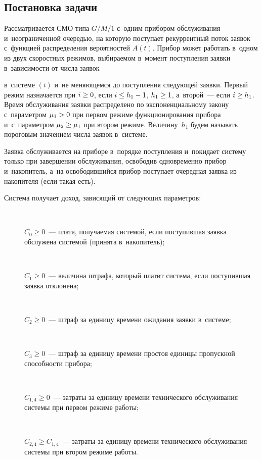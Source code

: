 \begin{multicols}{2}
\vspace*{-12pt}

\section{Постановка задачи}

\vspace*{-3pt}

  Рассматривается СМО типа $G/M/1$ с~одним прибором обслуживания 
  и~неограниченной оче\-редью, на которую поступает рекуррентный поток заявок 
  с~функцией распределения вероятностей $A(t)$. Прибор может работать в~одном 
из двух скоростных режимов, выбираемом в~момент поступления заявки 
в~зависимости от числа заявок\linebreak\vspace*{-12pt}

\pagebreak

\noindent
 в~сис\-те\-ме $(i)$ и~не меняющемся до 
поступления следующей заявки. Первый режим назначается при $i\hm\geq0$, 
если $i\hm\leq h_1\hm- 1$, $h_1\hm\geq 1$, а~второй~--- если $i\hm\geq h_1$. 
Время обслуживания заявки распределено по экспоненциальному закону 
с~па\-ра\-мет\-ром $\mu_1\hm>0$ при первом режиме функционирования прибора 
и~с~па\-ра\-мет\-ром $\mu_2\hm\geq \mu_1$ при втором режиме. Величину~$h_1$ 
будем называть пороговым значением числа заявок в~сис\-теме.
  
  Заявка обслуживается на приборе в~порядке поступления и~покидает сис\-те\-му 
только при завершении обслуживания, освободив одновременно прибор 
и~накопитель, а~на освободившийся прибор поступает очередная заявка из 
накопителя (если такая есть). 
  
  Система получает доход, зависящий от сле\-ду\-ющих параметров:
  \begin{description}
  \item[\,] $C_0\geq 0$~--- плата, получаемая сис\-те\-мой, если поступившая 
заявка обслужена сис\-те\-мой (принята в~накопитель); 
  \item[\,] $C_1\geq 0$~--- величина штрафа, который платит сис\-те\-ма, если 
поступившая заявка отклонена;
  \item[\,] $C_2\geq 0$~--- штраф за единицу времени ожидания заявки 
в~сис\-теме;
  \item[\,] $C_3\geq 0$~--- штраф за единицу времени простоя единицы 
пропускной способности прибора;
  \item[\,] $C_{1,4}\geq 0$~--- затраты за единицу времени технического 
обслуживания сис\-те\-мы при первом режиме работы;
  \item[\,] $C_{2,4}\geq C_{1,4}$~--- затраты за единицу времени технического 
обслуживания сис\-те\-мы при втором режиме работы. 
  \end{description}
  

\end{multicols}
